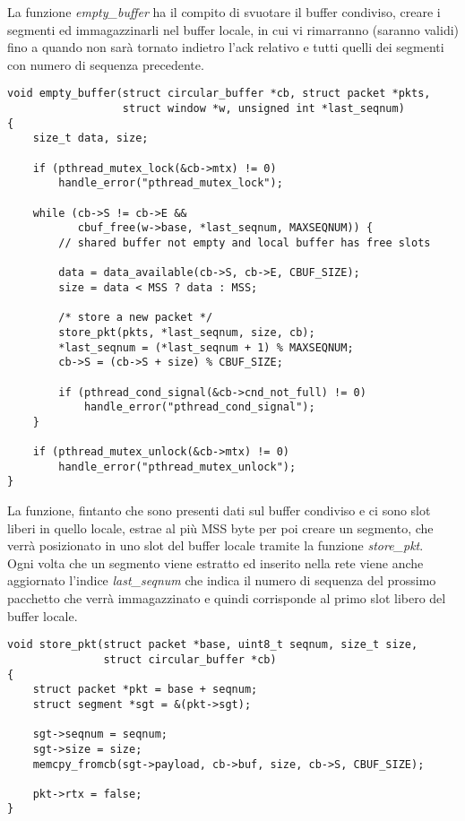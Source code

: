 La funzione \emph{empty\_buffer} ha il compito di svuotare il buffer condiviso,
creare i segmenti ed immagazzinarli nel buffer locale, in cui vi rimarranno
(saranno validi) fino a quando non sarà tornato indietro l'ack relativo e 
tutti quelli dei segmenti con numero di sequenza precedente.

\begin{lstlisting}[title=transport.c]
void empty_buffer(struct circular_buffer *cb, struct packet *pkts,
                  struct window *w, unsigned int *last_seqnum)
{
    size_t data, size;

    if (pthread_mutex_lock(&cb->mtx) != 0)
        handle_error("pthread_mutex_lock");

    while (cb->S != cb->E && 
           cbuf_free(w->base, *last_seqnum, MAXSEQNUM)) {
        // shared buffer not empty and local buffer has free slots

        data = data_available(cb->S, cb->E, CBUF_SIZE);
        size = data < MSS ? data : MSS;

        /* store a new packet */
        store_pkt(pkts, *last_seqnum, size, cb);
        *last_seqnum = (*last_seqnum + 1) % MAXSEQNUM;
        cb->S = (cb->S + size) % CBUF_SIZE;

        if (pthread_cond_signal(&cb->cnd_not_full) != 0)
            handle_error("pthread_cond_signal");
    }

    if (pthread_mutex_unlock(&cb->mtx) != 0)
        handle_error("pthread_mutex_unlock");
}
\end{lstlisting}
La funzione, fintanto che sono presenti dati sul buffer condiviso e ci sono 
slot liberi in quello locale, estrae al più MSS byte per poi creare un segmento,
che verrà posizionato in uno slot del buffer locale tramite la 
funzione \emph{store\_pkt}.\\
Ogni volta che un segmento viene estratto ed inserito nella rete viene anche 
aggiornato l'indice \emph{last\_seqnum} che indica il numero di sequenza del
prossimo pacchetto che verrà immagazzinato e quindi corrisponde al primo slot
libero del buffer locale.
\begin{lstlisting}[title=transport.c]
void store_pkt(struct packet *base, uint8_t seqnum, size_t size,
               struct circular_buffer *cb)
{
    struct packet *pkt = base + seqnum;
    struct segment *sgt = &(pkt->sgt);

    sgt->seqnum = seqnum;
    sgt->size = size;
    memcpy_fromcb(sgt->payload, cb->buf, size, cb->S, CBUF_SIZE);

    pkt->rtx = false;
}
\end{lstlisting}

